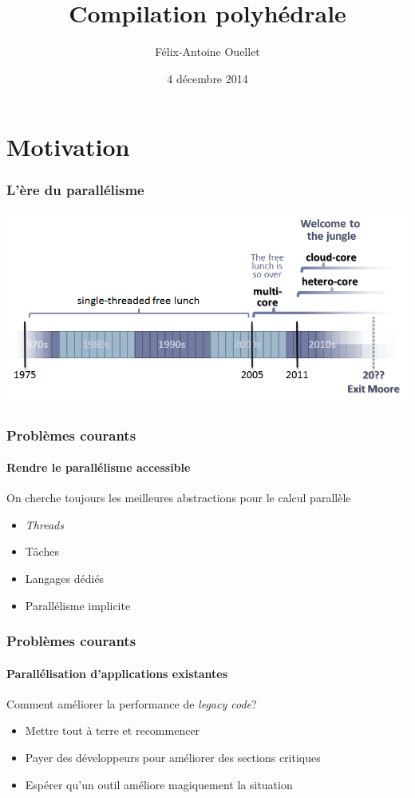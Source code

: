\documentclass{beamer}
\author[Félix-Antoine Ouellet]{Félix-Antoine Ouellet}
\title[PolyOpt\hspace{2em}\insertframenumber/\inserttotalframenumber]{Compilation polyhédrale}
\institute{Université de Sherbrooke}
\date{4 décembre 2014}
\begin{document}
\begin{frame}
\titlepage %
\end{frame}

\begin{frame}
\tableofcontents[hideallsubsections]
\end{frame}

\section{Motivation}
\begin{frame}
\frametitle{L'ère du parallélisme}
\colorbox{white}{\includegraphics[scale=0.48]{parallel.png}}
\end{frame}

\begin{frame}
\frametitle{Problèmes courants}
\framesubtitle{Rendre le parallélisme accessible}
On cherche toujours les meilleures abstractions pour le calcul parallèle
\begin{itemize}
\item \textit{Threads}
\item Tâches
\item Langages dédiés
\item Parallélisme implicite
\end{itemize}
\end{frame}

\begin{frame}
\frametitle{Problèmes courants}
\framesubtitle{Parallélisation d'applications existantes}
Comment améliorer la performance de \textit{legacy code}?
\begin{itemize}
\item Mettre tout à terre et recommencer
\item Payer des développeurs pour améliorer des sections critiques
\item Espérer qu'un outil améliore magiquement la situation
\end{itemize}
\end{frame}
\end{document}

